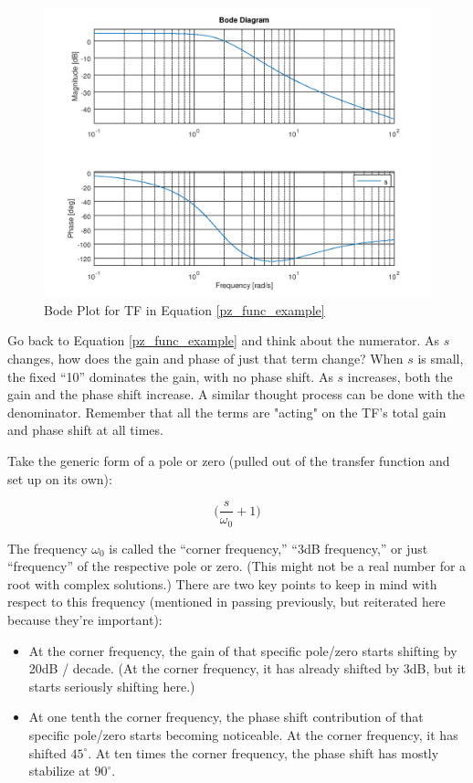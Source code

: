 \begin{figure}[h]
\centering
\includegraphics[scale=0.5]{pz_example_bode.png}
\caption{Bode Plot for TF in Equation \ref{pz_func_example}}\label{pz_ex_bode}
\end{figure}

Go back to Equation \ref{pz_func_example} and think about the numerator. As $s$ changes, how does the gain and phase of just that term change? When $s$ is small, the fixed ``10'' dominates the gain, with no phase shift. As $s$ increases, both the gain and the phase shift increase. A similar thought process can be done with the denominator. Remember that all the terms are "acting" on the TF's total gain and phase shift at all times.

Take the generic form of a pole or zero (pulled out of the transfer function and set up on its own):

\begin{equation}
\bigg(\frac{s}{\omega_0} + 1\bigg)
\end{equation}

The frequency $\omega_0$ is called the ``corner frequency,'' ``3dB frequency,'' or just ``frequency'' of the respective pole or zero. (This might not be a real number for a root with complex solutions.) There are two key points to keep in mind with respect to this frequency (mentioned in passing previously, but reiterated here because they're important):

\begin{itemize}
\item At the corner frequency, the gain of that specific pole/zero starts shifting by 20dB / decade. (At the corner frequency, it has already shifted by 3dB, but it starts seriously shifting here.)
\item At one tenth the corner frequency, the phase shift contribution of that specific pole/zero starts becoming noticeable. At the corner frequency, it has shifted $45^{\circ}$. At ten times the corner frequency, the phase shift has mostly stabilize at $90^{\circ}$.
\end{itemize}

